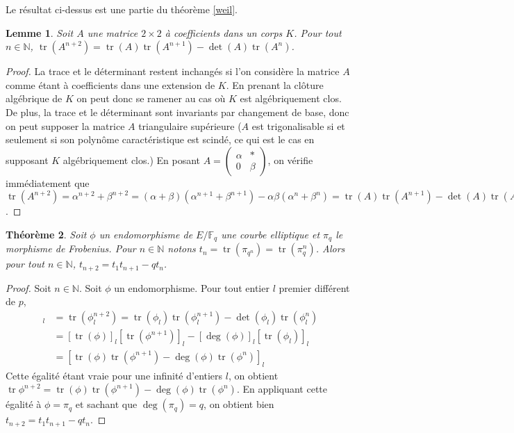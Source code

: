 \documentclass{article}
\theoremstyle{plain}%
\newtheorem{thm}{Théorème}[section]
\newtheorem{lem}[thm]{Lemme}
\theoremstyle{definition}%
\newcommand{\F}{\mathbb{F}}
\newcommand{\N}{\mathbb{N}}
\DeclareMathOperator{\tr}{tr}
\begin{document}
Le résultat ci-dessus est une partie du théorème \ref{weil}.

\begin{lem}
  Soit $A$ une matrice $2\times 2$ à coefficients dans un corps $K$. Pour tout $n\in\N$, $\tr(A^{n+2}) = \tr(A)\tr(A^{n+1}) - \det(A)\tr(A^n)$.
\end{lem}

\begin{proof}
  La trace et le déterminant restent inchangés si l'on considère la matrice $A$ comme étant à coefficients dans une extension de $K$. En prenant la clôture algébrique de $K$ on peut donc se ramener au cas où $K$ est algébriquement clos. De plus, la trace et le déterminant sont invariants par changement de base, donc on peut supposer la matrice $A$ triangulaire supérieure ($A$ est trigonalisable si et seulement si son polynôme caractéristique est scindé, ce qui est le cas en supposant $K$ algébriquement clos.) En posant $A = \begin{pmatrix} \alpha & * \\ 0 & \beta \end{pmatrix}$, on vérifie immédiatement que $\tr(A^{n+2}) = \alpha^{n+2} + \beta^{n+2} = (\alpha + \beta)(\alpha^{n+1} + \beta^{n+1}) - \alpha\beta(\alpha^n + \beta^n) = \tr(A)\tr(A^{n+1}) - \det(A)\tr(A^n)$.
\end{proof}

\begin{thm}
  Soit $\phi$ un endomorphisme de $E/\F_q$ une courbe elliptique et $\pi_q$ le morphisme de Frobenius. Pour $n\in\N$ notons $t_n = \tr(\pi_{q^n}) = \tr(\pi_q^n)$. Alors pour tout $n\in\N$, $t_{n+2} = t_1t_{n+1} - qt_n$.
\end{thm}

\begin{proof}
  Soit $n\in\N$. Soit $\phi$ un endomorphisme. Pour tout entier $l$ premier différent de $p$, 
  \begin{align*} 
    [\tr\phi^{n+2}]_l 
    &= \tr(\phi_l^{n+2}) 
    = \tr(\phi_l)\tr(\phi_l^{n+1})-\det(\phi_l)\tr(\phi_l^n) \\
    &= [\tr(\phi)]_l [\tr(\phi^{n+1})]_l-[\deg(\phi)]_l[\tr(\phi_l)]_l \\
    &= [\tr(\phi)\tr(\phi^{n+1})-\deg(\phi)\tr(\phi^n)]_l 
  \end{align*}
  Cette égalité étant vraie pour une infinité d'entiers $l$, on obtient $\tr\phi^{n+2} =  \tr(\phi)\tr(\phi^{n+1})-\deg(\phi)\tr(\phi^n)$. En appliquant cette égalité à $\phi = \pi_q$ et sachant que $\deg(\pi_q)=q$, on obtient bien $t_{n+2} = t_1t_{n+1}-qt_n$. 

\end{proof}
\end{document}
